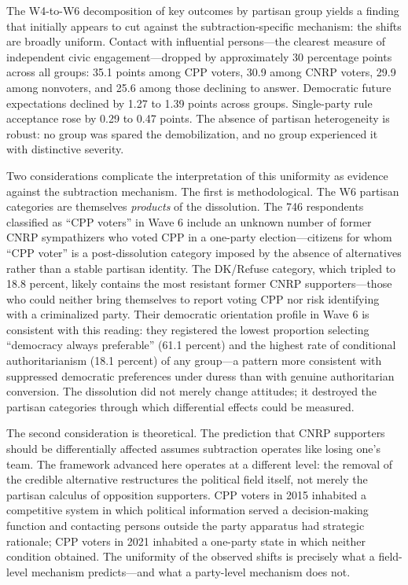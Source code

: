 \documentclass[Review,times,sageh,doublespace]{sagej}
\begin{document}
The W4-to-W6 decomposition of key outcomes by partisan group yields a
finding that initially appears to cut against the subtraction-specific
mechanism: the shifts are broadly uniform. Contact with influential
persons---the clearest measure of independent civic engagement---dropped
by approximately 30 percentage points across all groups: 35.1 points
among CPP voters, 30.9 among CNRP voters, 29.9 among nonvoters, and 25.6
among those declining to answer. Democratic future expectations declined
by 1.27 to 1.39 points across groups. Single-party rule acceptance rose
by 0.29 to 0.47 points. The absence of partisan heterogeneity is robust:
no group was spared the demobilization, and no group experienced it with
distinctive severity.

Two considerations complicate the interpretation of this uniformity as
evidence against the subtraction mechanism. The first is methodological.
The W6 partisan categories are themselves \emph{products} of the
dissolution. The 746 respondents classified as ``CPP voters'' in Wave 6
include an unknown number of former CNRP sympathizers who voted CPP in a
one-party election---citizens for whom ``CPP voter'' is a
post-dissolution category imposed by the absence of alternatives rather
than a stable partisan identity. The DK/Refuse category, which tripled
to 18.8 percent, likely contains the most resistant former CNRP
supporters---those who could neither bring themselves to report voting
CPP nor risk identifying with a criminalized party. Their democratic
orientation profile in Wave 6 is consistent with this reading: they
registered the lowest proportion selecting ``democracy always
preferable'' (61.1 percent) and the highest rate of conditional
authoritarianism (18.1 percent) of any group---a pattern more consistent
with suppressed democratic preferences under duress than with genuine
authoritarian conversion. The dissolution did not merely change
attitudes; it destroyed the partisan categories through which
differential effects could be measured.

The second consideration is theoretical. The prediction that CNRP
supporters should be differentially affected assumes subtraction
operates like losing one's team. The framework advanced here operates at
a different level: the removal of the credible alternative restructures
the political field itself, not merely the partisan calculus of
opposition supporters. CPP voters in 2015 inhabited a competitive system
in which political information served a decision-making function and
contacting persons outside the party apparatus had strategic rationale;
CPP voters in 2021 inhabited a one-party state in which neither
condition obtained. The uniformity of the observed shifts is precisely
what a field-level mechanism predicts---and what a party-level mechanism
does not.
\end{document}
